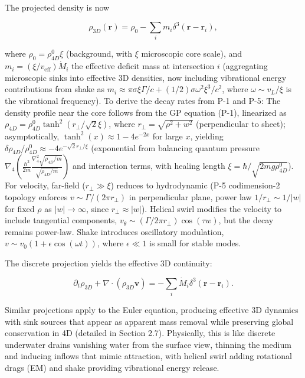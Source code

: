 The projected density is now

\[
\rho_{3D}(\mathbf{r}) = \rho_0 - \sum_i m_i \delta^3(\mathbf{r} - \mathbf{r}_i),
\]

where $\rho_0 = \rho_{4D}^0 \xi$ (background, with $\xi$ microscopic core scale), and $m_i = (\xi / v_{\text{eff}}) \dot{M}_i$ the effective deficit mass at intersection $i$ (aggregating microscopic sinks into effective 3D densities, now including vibrational energy contributions from shake as $m_i \approx \pi \sigma \xi \Gamma / c + (1/2) \sigma \omega^2 \xi^3 / c^2$, where $\omega \sim v_L / \xi$ is the vibrational frequency). To derive the decay rates from P-1 and P-5: The density profile near the core follows from the GP equation (P-1), linearized as $\rho_{4D} = \rho_{4D}^0 \tanh^2 (r_\perp / \sqrt{2} \xi)$, where $r_\perp = \sqrt{\rho^2 + w^2}$ (perpendicular to sheet); asymptotically, $\tanh^2(x) \approx 1 - 4 e^{-2x}$ for large $x$, yielding $\delta \rho_{4D} / \rho_{4D}^0 \approx -4 e^{-\sqrt{2} r_\perp / \xi}$ (exponential from balancing quantum pressure $\nabla_4 \left( \frac{\hbar^2}{2 m} \frac{\nabla_4^2 \sqrt{\rho_{4D}/m}}{\sqrt{\rho_{4D}/m}} \right)$ and interaction terms, with healing length $\xi = \hbar / \sqrt{2 m g \rho_{4D}^0}$). For velocity, far-field ($r_\perp \gg \xi$) reduces to hydrodynamic (P-5 codimension-2 topology enforces $v \sim \Gamma / (2\pi r_\perp)$ in perpendicular plane, power law $1/r_\perp \sim 1/|w|$ for fixed $\rho$ as $|w| \to \infty$, since $r_\perp \approx |w|$). Helical swirl modifies the velocity to include tangential components, $v_\theta \sim (\Gamma / 2\pi r_\perp) \cos(\tau w)$, but the decay remains power-law. Shake introduces oscillatory modulation, $v \sim v_0 (1 + \epsilon \cos(\omega t))$, where $\epsilon \ll 1$ is small for stable modes.

The discrete projection yields the effective 3D continuity:

\[
\partial_t \rho_{3D} + \nabla \cdot (\rho_{3D} \mathbf{v}) = -\sum_i \dot{M}_i \delta^3(\mathbf{r} - \mathbf{r}_i).
\]

Similar projections apply to the Euler equation, producing effective 3D dynamics with sink sources that appear as apparent mass removal while preserving global conservation in 4D (detailed in Section 2.7). Physically, this is like discrete underwater drains vanishing water from the surface view, thinning the medium and inducing inflows that mimic attraction, with helical swirl adding rotational drags (EM) and shake providing vibrational energy release.

